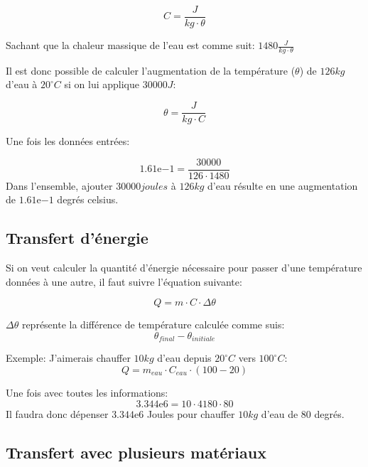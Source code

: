 \documentclass{article}
\begin{document}
\begin{equation}
	C = \frac{J}{kg \cdot \theta}
\end{equation}

Sachant que la chaleur massique de l'eau est comme suit: $1480 \frac{J}{kg \cdot \theta}$

Il est donc possible de calculer l'augmentation de la température ($\theta$) de $126kg$ d'eau à $20^\circ C$ si on lui applique $30000J$:

\begin{equation}
	\theta = \frac{J}{kg \cdot C}
\end{equation}

Une fois les données entrées:

\begin{equation}
	1.61\mathrm{e}{-1} = \frac{30000}{126 \cdot 1480}
\end{equation}
Dans l'ensemble, ajouter $30000 joules$ à $126kg$ d'eau résulte
en une augmentation de $1.61\mathrm{e}{-1}$ degrés celsius.

\subsection{Transfert d'énergie}

Si on veut calculer la quantité d'énergie nécessaire pour passer
d'une température données à une autre, il faut suivre l'équation
suivante:

\begin{equation}
	Q = m \cdot C \cdot \Delta \theta
\end{equation}

$\Delta\theta$ représente la différence de température calculée comme suis:
\begin{equation}
	\theta_{final} - \theta_{initiale}
\end{equation}

Exemple:
J'aimerais chauffer $10kg$ d'eau depuis $20^\circ C$ vers $100^\circ C$:
\begin{equation}
	Q = m_{eau} \cdot C_{eau} \cdot (100 - 20)
\end{equation}

Une fois avec toutes les informations:
\begin{equation}
	3.344\mathrm{e}{6} = 10 \cdot 4180 \cdot 80
\end{equation}
Il faudra donc dépenser $3.344\mathrm{e}{6}$ Joules pour chauffer $10kg$ d'eau de 80 degrés.

\subsection{Transfert avec plusieurs matériaux}
\end{document}
